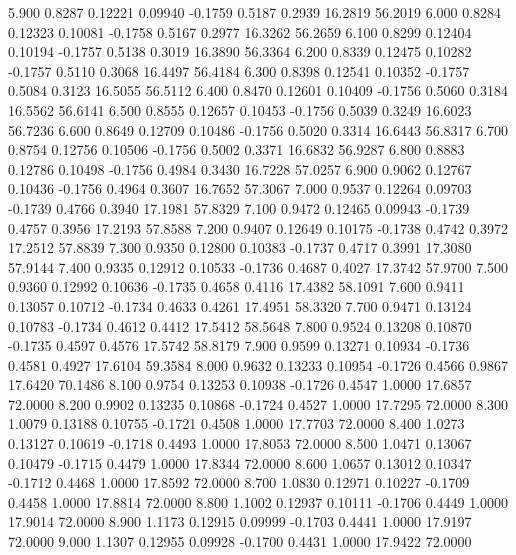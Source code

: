    5.900   0.8287   0.12221   0.09940  -0.1759   0.5187   0.2939  16.2819  56.2019
   6.000   0.8284   0.12323   0.10081  -0.1758   0.5167   0.2977  16.3262  56.2659
   6.100   0.8299   0.12404   0.10194  -0.1757   0.5138   0.3019  16.3890  56.3364
   6.200   0.8339   0.12475   0.10282  -0.1757   0.5110   0.3068  16.4497  56.4184
   6.300   0.8398   0.12541   0.10352  -0.1757   0.5084   0.3123  16.5055  56.5112
   6.400   0.8470   0.12601   0.10409  -0.1756   0.5060   0.3184  16.5562  56.6141
   6.500   0.8555   0.12657   0.10453  -0.1756   0.5039   0.3249  16.6023  56.7236
   6.600   0.8649   0.12709   0.10486  -0.1756   0.5020   0.3314  16.6443  56.8317
   6.700   0.8754   0.12756   0.10506  -0.1756   0.5002   0.3371  16.6832  56.9287
   6.800   0.8883   0.12786   0.10498  -0.1756   0.4984   0.3430  16.7228  57.0257
   6.900   0.9062   0.12767   0.10436  -0.1756   0.4964   0.3607  16.7652  57.3067
   7.000   0.9537   0.12264   0.09703  -0.1739   0.4766   0.3940  17.1981  57.8329
   7.100   0.9472   0.12465   0.09943  -0.1739   0.4757   0.3956  17.2193  57.8588
   7.200   0.9407   0.12649   0.10175  -0.1738   0.4742   0.3972  17.2512  57.8839
   7.300   0.9350   0.12800   0.10383  -0.1737   0.4717   0.3991  17.3080  57.9144
   7.400   0.9335   0.12912   0.10533  -0.1736   0.4687   0.4027  17.3742  57.9700
   7.500   0.9360   0.12992   0.10636  -0.1735   0.4658   0.4116  17.4382  58.1091
   7.600   0.9411   0.13057   0.10712  -0.1734   0.4633   0.4261  17.4951  58.3320
   7.700   0.9471   0.13124   0.10783  -0.1734   0.4612   0.4412  17.5412  58.5648
   7.800   0.9524   0.13208   0.10870  -0.1735   0.4597   0.4576  17.5742  58.8179
   7.900   0.9599   0.13271   0.10934  -0.1736   0.4581   0.4927  17.6104  59.3584
   8.000   0.9632   0.13233   0.10954  -0.1726   0.4566   0.9867  17.6420  70.1486
   8.100   0.9754   0.13253   0.10938  -0.1726   0.4547   1.0000  17.6857  72.0000
   8.200   0.9902   0.13235   0.10868  -0.1724   0.4527   1.0000  17.7295  72.0000
   8.300   1.0079   0.13188   0.10755  -0.1721   0.4508   1.0000  17.7703  72.0000
   8.400   1.0273   0.13127   0.10619  -0.1718   0.4493   1.0000  17.8053  72.0000
   8.500   1.0471   0.13067   0.10479  -0.1715   0.4479   1.0000  17.8344  72.0000
   8.600   1.0657   0.13012   0.10347  -0.1712   0.4468   1.0000  17.8592  72.0000
   8.700   1.0830   0.12971   0.10227  -0.1709   0.4458   1.0000  17.8814  72.0000
   8.800   1.1002   0.12937   0.10111  -0.1706   0.4449   1.0000  17.9014  72.0000
   8.900   1.1173   0.12915   0.09999  -0.1703   0.4441   1.0000  17.9197  72.0000
   9.000   1.1307   0.12955   0.09928  -0.1700   0.4431   1.0000  17.9422  72.0000
